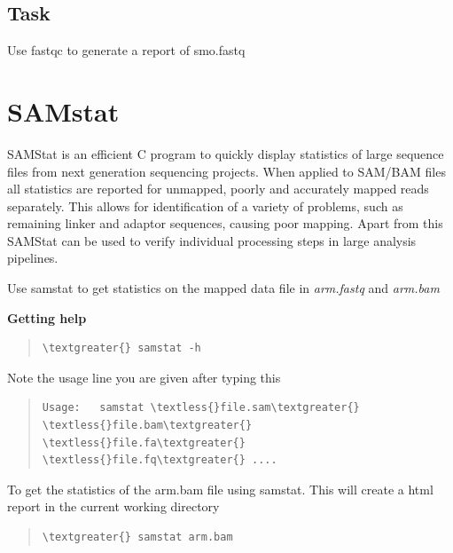 \documentclass[letterpaper,10pt,english]{sphinxmanual}
\begin{document}
\subsection{Task}
\label{STEP1_QualityControl:task}
Use fastqc to generate a report of smo.fastq


\section{SAMstat}
\label{STEP1_QualityControl:samstat}
SAMStat is an efficient C program to quickly display statistics of large sequence files from next generation sequencing projects. When applied to SAM/BAM files all statistics are reported for unmapped, poorly and accurately mapped reads separately. This allows for identification of a variety of problems, such as remaining linker and adaptor sequences, causing poor mapping. Apart from this SAMStat can be used to verify individual processing steps in large analysis pipelines.

Use samstat to get statistics on the mapped data file in \emph{arm.fastq} and \emph{arm.bam}

\textbf{Getting help}
\begin{quote}

\begin{Verbatim}[commandchars=\\\{\}]
\textgreater{} samstat -h
\end{Verbatim}
\end{quote}

Note the usage line you are given after typing this
\begin{quote}

\begin{Verbatim}[commandchars=\\\{\}]
Usage:   samstat \textless{}file.sam\textgreater{} \textless{}file.bam\textgreater{} \textless{}file.fa\textgreater{} \textless{}file.fq\textgreater{} ....
\end{Verbatim}
\end{quote}

To get the statistics of the arm.bam file using samstat. This will create a html report in the current working directory
\begin{quote}

\begin{Verbatim}[commandchars=\\\{\}]
\textgreater{} samstat arm.bam
\end{Verbatim}
\end{quote}
\end{document}
